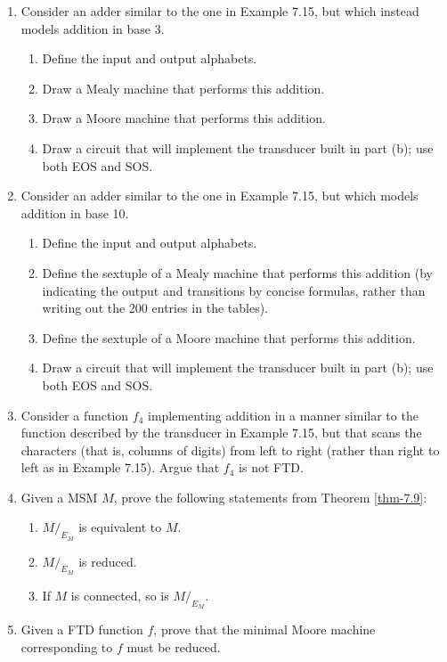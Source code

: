 \begin{enumerate}[{7.}1.]
\item Consider an adder similar to the one in Example 7.15, but which instead
models addition in base 3.
\begin{enumerate}
\item Define the input and output alphabets.
\item Draw a Mealy machine that performs this addition.
\item Draw a Moore machine that performs this addition.
\item Draw a circuit that will implement the transducer built in part (b); use
both \<EOS\> and \<SOS\>.
\end{enumerate}

\item Consider an adder similar to the one in Example 7.15, but which models
addition in base 10.
\begin{enumerate}
\item Define the input and output alphabets.
\item Define the sextuple of a Mealy machine that performs this addition (by
indicating the output and transitions by concise formulas, rather than writing
out the 200 entries in the tables).
\item Define the sextuple of a Moore machine that performs this addition.
\item Draw a circuit that will implement the transducer built in part (b); use
both \<EOS\> and \<SOS\>.
\end{enumerate}

\item Consider a function $f_4$ implementing addition in a manner similar to
the function described by the transducer in Example 7.15, but that scans the
characters (that is, columns of digits) from left to right (rather than right to
left as in Example 7.15). Argue that $f_4$ is not FTD.

\item Given a MSM $M$, prove the following statements from Theorem \ref{thm-7.9}:
\begin{enumerate}
\item $M/  _{E_M}$ is equivalent to $M$.
\item $M/  _{E_M}$ is reduced.
\item If $M$ is connected, so is $M/  _{E_M}$.
\end{enumerate}

\item Given a FTD function $f$, prove that the minimal Moore machine
corresponding to $f$ must be reduced.


\end{enumerate}
